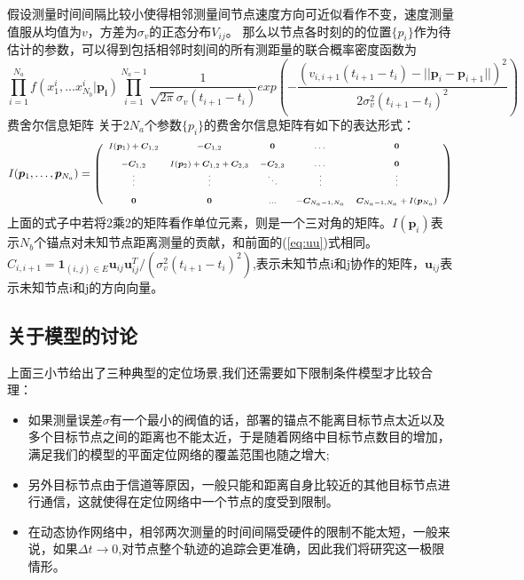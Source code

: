 假设测量时间间隔比较小使得相邻测量间节点速度方向可近似看作不变，速度测量值服从均值为$v$，方差为$\sigma_{v}$的正态分布$V_{ij}$。
那么以节点各时刻的的位置$\{p_i\}$作为待估计的参数，可以得到包括相邻时刻间的所有测距量的联合概率密度函数为
\begin{equation}\label{eq:single}
\prod_{i=1}^{N_a} f(x^i_1,...x^{i}_{N_b}|\bm{p_i})
\prod_{i=1}^{N_a-1}\frac{1}{\sqrt{2\pi}\sigma_v(t_{i+1}-t_i)}
exp(-\frac{(v_{i,i+1}(t_{i+1}-t_i)-||\bm{p}_i-\bm{p}_{i+1}||)^2}{2\sigma_v^2(t_{i+1}-t_i)^2})
\end{equation}
{费舍尔信息矩阵}
关于$2N_a$个参数$\{p_i\}$的费舍尔信息矩阵有如下的表达形式：
\begin{equation}\label{eq:time_cooperation_matrix}
\scriptsize{
I(\bm{p}_1,\dots,\bm{p}_{N_a})=
\left(
\begin{array}{ccccc}
I(\bm{p}_1)+\bm{C}_{1,2}&-\bm{C}_{1,2}&\bm{0}&\dots&\bm{0}\\
&&&&\\
-\bm{C}_{1,2} & I(\bm{p}_2)+\bm{C}_{1,2}+\bm{C}_{2,3}&-\bm{C}_{2,3}&\dots&\bm{0}\\
\vdots &\vdots&\ddots &\vdots&\vdots\\
&&&&\\
\bm{0}&\bm{0}&...& -\bm{C}_{N_a-1,N_a}&\bm{C}_{N_a-1,N_a}+I(\bm{p}_{N_a})\\
\end{array}
\right)
}
\end{equation}
上面的式子中若将2乘2的矩阵看作单位元素，则是一个三对角的矩阵。$I(\bm{p}_i)$表示$N_b$个锚点对未知节点距离测量的贡献，和前面的(\ref{eq:uu})式相同。$C_{i,i+1}=\bm{1}_{(i,j)\in E}\bm{u}_{ij}\bm{u}_{ij}^T/(\sigma_v^2(t_{i+1}-t_i)^2)$,表示未知节点i和j协作的矩阵，$\bm{u}_{ij}$表示未知节点i和j的方向向量。
\subsection{关于模型的讨论}\label{subsection:model_discussion}
上面三小节给出了三种典型的定位场景,我们还需要如下限制条件模型才比较合理：
\begin{itemize}
  \item 如果测量误差$\sigma$有一个最小的阀值的话，部署的锚点不能离目标节点太近以及多个目标节点之间的距离也不能太近，于是随着网络中目标节点数目的增加，满足我们的模型的平面定位网络的覆盖范围也随之增大;
  \item 另外目标节点由于信道等原因，一般只能和距离自身比较近的其他目标节点进行通信，这就使得在定位网络中一个节点的度受到限制。
  \item 在动态协作网络中，相邻两次测量的时间间隔受硬件的限制不能太短，一般来说，如果$\Delta t \to 0$,对节点整个轨迹的追踪会更准确，因此我们将研究这一极限情形。
\end{itemize}
